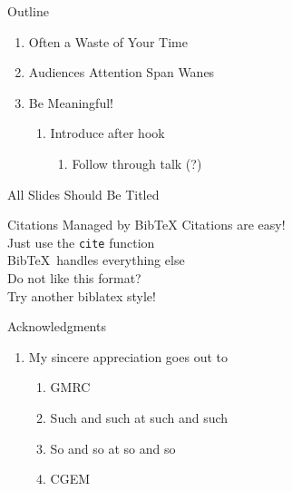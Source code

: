 \documentclass[aspectratio=169]{beamer}
\begin{document}
  \titleframe

  \begin{frame}{Outline}
    \begin{enumerate}
      \item Often a Waste of Your Time
      \item Audiences Attention Span Wanes
      \item Be Meaningful! \\[1mm]
      \begin{enumerate}
        \item Introduce after hook \\[2mm]
        \begin{enumerate}
          \item Follow through talk (?)
        \end{enumerate}
      \end{enumerate}
    \end{enumerate}
  \end{frame}
 
  \begin{frame}{All Slides Should Be Titled}
  \end{frame}
  
  \begin{frame}{Citations Managed by Bib\TeX}
    \LARGE
    Citations are easy! \cite{doi:10.1190/1.1444302} \\[2mm]

    Just use the \texttt{cite} function \cite{doi:10.1190/image2022-3729385.1} \\[2mm]
    
    Bib\TeX\  handles everything else \cite{WEIHERMANN2021104682} \\[1cm]
    
    Do not like this format? \\

    Try another biblatex style! \cite{doi:10.1190/geo2020-0729.1}

  \end{frame}
 
  \begin{frame}{Acknowledgments}
    \vspace{-2cm}
    \begin{enumerate}
      \item My sincere appreciation goes out to
      \begin{enumerate}
        \item GMRC
        \item Such and such at such and such
        \item So and so at so and so
        \item CGEM 
      \end{enumerate}
    \end{enumerate}
  \end{frame}

  \questionslide
  
\end{document}
